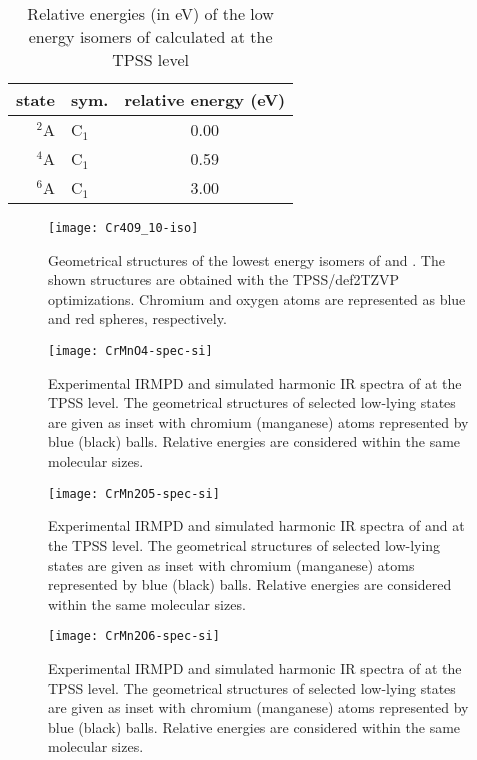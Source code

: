 \begin{table}[]
	\centering
	\caption{Relative energies (in eV) of the low energy isomers of  calculated at the TPSS level}
	\begin{tabular}{@{}rlc@{}}
	\toprule
	state    & sym.    & relative energy (eV) \\ \midrule
	$^2$A    & C$_1$   & 0.00                 \\
	$^4$A    & C$_1$   & 0.59                 \\
	$^6$A    & C$_1$   & 3.00                 \\ \bottomrule
	\end{tabular}
\end{table}



\begin{figure}
	\centering
	\texttt{[image: Cr4O9\_10-iso]}
	\caption{Geometrical structures of the lowest energy isomers of  and . The shown structures are obtained with the TPSS/def2TZVP optimizations. Chromium and oxygen atoms are represented as blue and red spheres, respectively.}
	\label{figs:Cr4O9_10}
\end{figure}




\begin{figure}
	\centering
	\texttt{[image: CrMnO4-spec-si]}
	\caption{Experimental IRMPD and simulated harmonic IR spectra of  at the TPSS level. The geometrical structures of selected low-lying states are given as inset with chromium (manganese) atoms represented by blue (black) balls. Relative energies are considered within the same molecular sizes.}
	\label{figs:CrMnO4-spec-si}
\end{figure}




\begin{figure}
	\centering
	\texttt{[image: CrMn2O5-spec-si]}
	\caption{Experimental IRMPD and simulated harmonic IR spectra of  and  at the TPSS level. The geometrical structures of selected low-lying states are given as inset with chromium (manganese) atoms represented by blue (black) balls. Relative energies are considered within the same molecular sizes.}
	\label{figs:CrMn2O5-spec-si}
\end{figure}


\begin{figure}
	\centering
	\texttt{[image: CrMn2O6-spec-si]}
	\caption{Experimental IRMPD and simulated harmonic IR spectra of  at the TPSS level. The geometrical structures of selected low-lying states are given as inset with chromium (manganese) atoms represented by blue (black) balls. Relative energies are considered within the same molecular sizes.}
	\label{figs:CrMn2O5-spec-si}
\end{figure}



